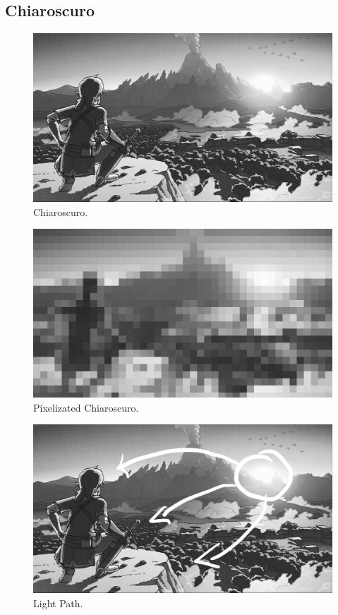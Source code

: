 \documentclass{cup-pan}
\begin{document}
        \subsection{Chiaroscuro}
            \begin{figure}[H]
                \includegraphics[width=\textwidth]{Imagenes/Referencias/Analisis_ConceptArt/claroscuro.png}
                \caption{Chiaroscuro.}
            \end{figure}

            \begin{figure}[H]
                \includegraphics[width=\textwidth]{Imagenes/Referencias/Analisis_ConceptArt/pixel.png}
                \caption{Pixelizated Chiaroscuro.}
            \end{figure}

            \begin{figure}[H]
                \includegraphics[width=\textwidth]{Imagenes/Referencias/Analisis_ConceptArt/recorrido luz.png}
                \caption{Light Path.}
            \end{figure}
\end{document}
